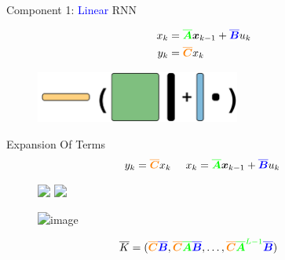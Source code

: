 \begin{frame}{Component 1: \textcolor{blue}{Linear} RNN}

    \begin{align*}
    x_{k} &= \textcolor{green}{\boldsymbol{\overline{A}}} \textcolor{black}{\boldsymbol{x}_{k-1}} + \textcolor{blue}{\boldsymbol{\overline{B}}} \textcolor{black}{u_k} \\ 
    y_k &=  \textcolor{orange}{\boldsymbol{\overline{C}}} x_{k \phantom{- 1}}
    \end{align*}
    \pause
    \begin{figure}
        \centering
        \includegraphics[width=0.6\textwidth]{Figs/ssm.png}
        \label{fig:my_label}
    \end{figure}
\end{frame}

\begin{frame}{Expansion Of Terms}
\vspace{-0.5cm}
    \begin{align*}
    y_k =  \textcolor{orange}{\boldsymbol{\overline{C}}} x_{k \phantom{- 1}} \ 
    x_{k} = \textcolor{green}{\boldsymbol{\overline{A}}} \textcolor{black}{\boldsymbol{x}_{k-1}} + \textcolor{blue}{\boldsymbol{\overline{B}}} \textcolor{black}{u_k} \ 
    \end{align*}
    \pause 
    \vspace{-2cm}
\begin{figure}
    \centering
     \only<4->{\[y_3\]}
    \includegraphics<2>[height=0.12\textwidth]{Figs/ssmrec0}
    
    \includegraphics<3>[height=0.12\textwidth]{Figs/ssmrec1}
    
     \includegraphics<4->[height=0.1\textwidth]{Figs/ssmrec}
    \label{fig:my_label}
\end{figure}
\vspace{-0.5cm}

\pause\pause\pause
\begin{align*}
\overline{K} &= (\textcolor{orange}{\boldsymbol{\overline{C}}}\textcolor{blue}{\boldsymbol{\overline{B}}}, \textcolor{orange}{\boldsymbol{\overline{C}}}\textcolor{green}{\boldsymbol{\overline{A}}}\textcolor{blue}{\boldsymbol{\overline{B}}}, \dots, \textcolor{orange}{\boldsymbol{\overline{C}}}\textcolor{green}{\boldsymbol{\overline{A}}^{L-1}}\textcolor{blue}{\boldsymbol{\overline{B}}})
\end{align*}
\end{frame}

